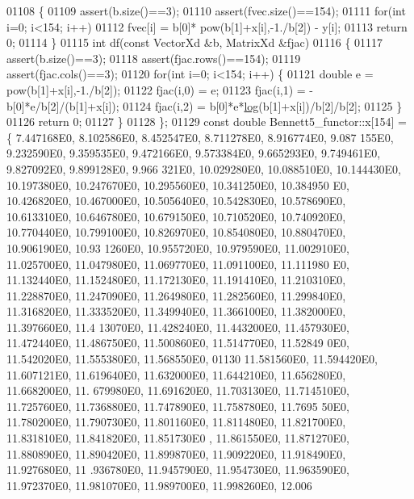 \begin{DoxyCode}
01108     \{
01109         assert(b.size()==3);
01110         assert(fvec.size()==154);
01111         \textcolor{keywordflow}{for}(\textcolor{keywordtype}{int} i=0; i<154; i++)
01112             fvec[i] = b[0]* pow(b[1]+x[i],-1./b[2]) - y[i];
01113         \textcolor{keywordflow}{return} 0;
01114     \}
01115     \textcolor{keywordtype}{int} df(\textcolor{keyword}{const} VectorXd &b, MatrixXd &fjac)
01116     \{
01117         assert(b.size()==3);
01118         assert(fjac.rows()==154);
01119         assert(fjac.cols()==3);
01120         \textcolor{keywordflow}{for}(\textcolor{keywordtype}{int} i=0; i<154; i++) \{
01121             \textcolor{keywordtype}{double} e = pow(b[1]+x[i],-1./b[2]);
01122             fjac(i,0) = e;
01123             fjac(i,1) = - b[0]*e/b[2]/(b[1]+x[i]);
01124             fjac(i,2) = b[0]*e*\hyperlink{structlog}{log}(b[1]+x[i])/b[2]/b[2];
01125         \}
01126         \textcolor{keywordflow}{return} 0;
01127     \}
01128 \};
01129 \textcolor{keyword}{const} \textcolor{keywordtype}{double} Bennett5\_functor::x[154] = \{ 7.447168E0, 8.102586E0, 8.452547E0, 8.711278E0, 8.916774E0, 9.087
      155E0, 9.232590E0, 9.359535E0, 9.472166E0, 9.573384E0, 9.665293E0, 9.749461E0, 9.827092E0, 9.899128E0, 9.966
      321E0, 10.029280E0, 10.088510E0, 10.144430E0, 10.197380E0, 10.247670E0, 10.295560E0, 10.341250E0, 10.384950
      E0, 10.426820E0, 10.467000E0, 10.505640E0, 10.542830E0, 10.578690E0, 10.613310E0, 10.646780E0, 10.679150E0, 
      10.710520E0, 10.740920E0, 10.770440E0, 10.799100E0, 10.826970E0, 10.854080E0, 10.880470E0, 10.906190E0, 10.93
      1260E0, 10.955720E0, 10.979590E0, 11.002910E0, 11.025700E0, 11.047980E0, 11.069770E0, 11.091100E0, 11.111980
      E0, 11.132440E0, 11.152480E0, 11.172130E0, 11.191410E0, 11.210310E0, 11.228870E0, 11.247090E0, 11.264980E0, 
      11.282560E0, 11.299840E0, 11.316820E0, 11.333520E0, 11.349940E0, 11.366100E0, 11.382000E0, 11.397660E0, 11.4
      13070E0, 11.428240E0, 11.443200E0, 11.457930E0, 11.472440E0, 11.486750E0, 11.500860E0, 11.514770E0, 11.52849
      0E0, 11.542020E0, 11.555380E0, 11.568550E0,
01130 11.581560E0, 11.594420E0, 11.607121E0, 11.619640E0, 11.632000E0, 11.644210E0, 11.656280E0, 11.668200E0, 11.
      679980E0, 11.691620E0, 11.703130E0, 11.714510E0, 11.725760E0, 11.736880E0, 11.747890E0, 11.758780E0, 11.7695
      50E0, 11.780200E0, 11.790730E0, 11.801160E0, 11.811480E0, 11.821700E0, 11.831810E0, 11.841820E0, 11.851730E0
      , 11.861550E0, 11.871270E0, 11.880890E0, 11.890420E0, 11.899870E0, 11.909220E0, 11.918490E0, 11.927680E0, 11
      .936780E0, 11.945790E0, 11.954730E0, 11.963590E0, 11.972370E0, 11.981070E0, 11.989700E0, 11.998260E0, 12.006

\end{DoxyCode}
